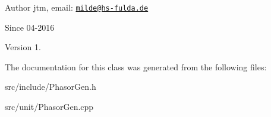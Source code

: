 \begin{DoxyAuthor}{Author}
jtm, email\-:  \href{mailto:milde@hs-fulda.de}{\tt milde@hs-\/fulda.\-de} 
\end{DoxyAuthor}
\begin{DoxySince}{Since}
04-\/2016 
\end{DoxySince}
\begin{DoxyVersion}{Version}
1. 
\end{DoxyVersion}


The documentation for this class was generated from the following files\-:\begin{DoxyCompactItemize}
\item 
src/include/Phasor\-Gen.\-h\item 
src/unit/Phasor\-Gen.\-cpp\end{DoxyCompactItemize}
